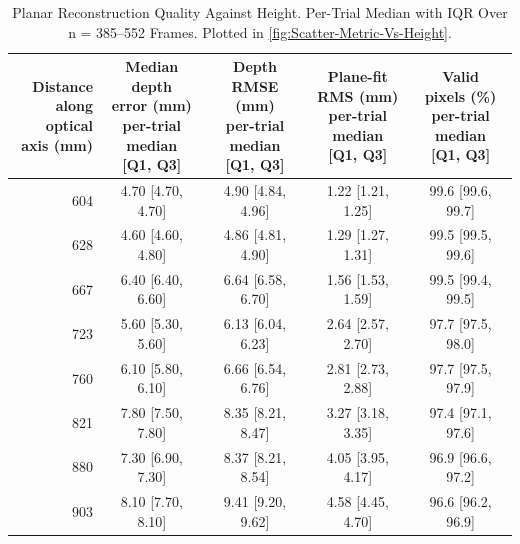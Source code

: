 \begin{table}[H]
	\centering
	\footnotesize
	\setlength{\tabcolsep}{4pt}
	\caption{Planar Reconstruction Quality Against Height. Per-Trial Median with IQR Over n = 385--552 Frames. Plotted in \autoref{fig:Scatter-Metric-Vs-Height}.}
	\label{tab:Scatter_Metric_Vs_Height}
	\begin{tabular}{r *{4}{c}}
		\toprule
		\makecell{Distance\\along optical\\axis (mm)} & \makecell{Median depth\\error (mm)\\{\scriptsize per-trial median}\\{\scriptsize [Q1, Q3]}} & \makecell{Depth\\RMSE (mm)\\{\scriptsize per-trial median}\\{\scriptsize [Q1, Q3]}} & \makecell{Plane-fit\\RMS (mm)\\{\scriptsize per-trial median}\\{\scriptsize [Q1, Q3]}} & \makecell{Valid\\pixels (\%)\\{\scriptsize per-trial median}\\{\scriptsize [Q1, Q3]}} \\
		\midrule
		604 & 4.70 [4.70, 4.70] & 4.90 [4.84, 4.96] & 1.22 [1.21, 1.25] & 99.6 [99.6, 99.7] \\
		628 & 4.60 [4.60, 4.80] & 4.86 [4.81, 4.90] & 1.29 [1.27, 1.31] & 99.5 [99.5, 99.6] \\
		667 & 6.40 [6.40, 6.60] & 6.64 [6.58, 6.70] & 1.56 [1.53, 1.59] & 99.5 [99.4, 99.5] \\
		723 & 5.60 [5.30, 5.60] & 6.13 [6.04, 6.23] & 2.64 [2.57, 2.70] & 97.7 [97.5, 98.0] \\
		760 & 6.10 [5.80, 6.10] & 6.66 [6.54, 6.76] & 2.81 [2.73, 2.88] & 97.7 [97.5, 97.9] \\
		821 & 7.80 [7.50, 7.80] & 8.35 [8.21, 8.47] & 3.27 [3.18, 3.35] & 97.4 [97.1, 97.6] \\
		880 & 7.30 [6.90, 7.30] & 8.37 [8.21, 8.54] & 4.05 [3.95, 4.17] & 96.9 [96.6, 97.2] \\
		903 & 8.10 [7.70, 8.10] & 9.41 [9.20, 9.62] & 4.58 [4.45, 4.70] & 96.6 [96.2, 96.9] \\
		\bottomrule
	\end{tabular}
\end{table}
